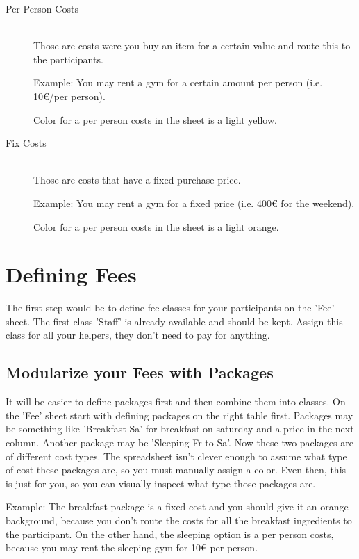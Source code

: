 \documentclass[11pt]{report}
\begin{document}
\begin{description}
	\item[Per Person Costs] \hfill \\
	Those are costs were you buy an item for a certain value and route this to the 
	participants.
	
	Example: You may rent a gym for a certain amount per person (i.e. 10€/per person).
	
	Color for a per person costs in the sheet is a light yellow.
	
	\item[Fix Costs] \hfill \\
	Those are costs that have a fixed purchase price.
	
	Example: You may rent a gym for a fixed price (i.e. 400€ for the weekend).

	Color for a per person costs in the sheet is a light orange.
	
\end{description}

\section{Defining Fees}

The first step would be to define fee classes for your participants on the 'Fee' 
sheet. The first class 'Staff' is already available and should be kept. Assign 
this class for all your helpers, they don't need to pay for anything.

\subsection{Modularize your Fees with Packages}

It will be easier to define packages first and then combine them into classes. 
On the 'Fee' sheet start with defining packages on the right table first. 
Packages may be something like 'Breakfast Sa' for breakfast on saturday and a price
in the next column. Another package may be 'Sleeping Fr to Sa'. Now these two 
packages are of different cost types. The spreadsheet isn't clever enough to 
assume what type of cost these packages are, so you must manually assign a 
color. Even then, this is just for you, so you can visually inspect what type 
those packages are.

Example: The breakfast package is a fixed cost and you should give it an orange 
background, because you don't route the costs for all the breakfast ingredients 
to the participant. On the other hand, the sleeping option is a per person 
costs, because you may rent the sleeping gym for 10€ per person.
\end{document}
